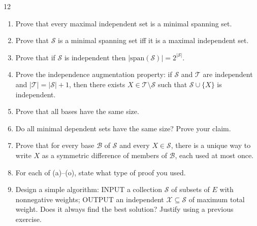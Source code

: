 \begin{exercise}{12}
\begin{enumerate}[label=(\alph*)]
        \item Prove that every maximal independent set is a minimal spanning set.
        \item Prove that $\mathcal S$ is a minimal spanning set iff it is a
              maximal independent set.
        \item Prove that if $\mathcal S$ is independent then
              $|\mathrm{span}(\mathcal S)|=2^{|\mathcal S|}$.
        \item Prove the independence augmentation property: if $\mathcal S$ and
              $\mathcal T$ are independent and $|\mathcal T|=|\mathcal S|+1$,
              then there exists $X\in\mathcal T\setminus\mathcal S$ such that
              $\mathcal S\cup\{X\}$ is independent.
        \item Prove that all bases have the same size.
        \item Do all minimal dependent sets have the same size? Prove your claim.
        \item Prove that for every base $\mathcal B$ of $\mathcal S$ and every
              $X\in\mathcal S$, there is a unique way to write $X$ as a symmetric
              difference of members of $\mathcal B$, each used at most once.
        \item For each of (a)--(o), state what type of proof you used.
        \item Design a simple algorithm: INPUT a collection $\mathcal S$ of
              subsets of $E$ with nonnegative weights; OUTPUT an independent
              $\mathcal X\subseteq\mathcal S$ of maximum total weight. Does it
              always find the best solution? Justify using a previous exercise.
    \end{enumerate}
\end{exercise}
